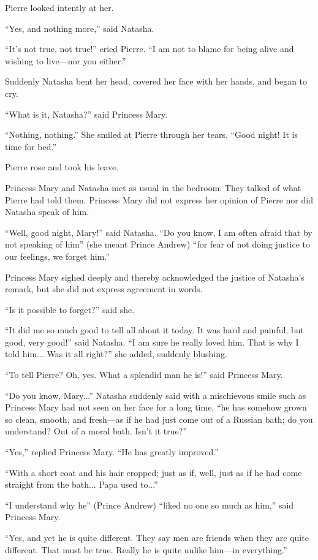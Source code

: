 Pierre looked intently at her.

``Yes, and nothing more,'' said Natasha.

``It's not true, not true!'' cried Pierre. ``I am not to blame
for being alive and wishing to live---nor you either.''

Suddenly Natasha bent her head, covered her face with her hands,
and began to cry.

``What is it, Natasha?'' said Princess Mary.

``Nothing, nothing.'' She smiled at Pierre through her
tears. ``Good night!  It is time for bed.''

Pierre rose and took his leave.

Princess Mary and Natasha met as usual in the bedroom. They
talked of what Pierre had told them. Princess Mary did not
express her opinion of Pierre nor did Natasha speak of him.

``Well, good night, Mary!'' said Natasha. ``Do you know, I am
often afraid that by not speaking of him'' (she meant Prince
Andrew) ``for fear of not doing justice to our feelings, we
forget him.''

Princess Mary sighed deeply and thereby acknowledged the justice
of Natasha's remark, but she did not express agreement in words.

``Is it possible to forget?'' said she.

``It did me so much good to tell all about it today. It was hard
and painful, but good, very good!'' said Natasha. ``I am sure he
really loved him. That is why I told him... Was it all right?''
she added, suddenly blushing.

``To tell Pierre? Oh, yes. What a splendid man he is!'' said
Princess Mary.

``Do you know, Mary...'' Natasha suddenly said with a mischievous
smile such as Princess Mary had not seen on her face for a long
time, ``he has somehow grown so clean, smooth, and fresh---as if
he had just come out of a Russian bath; do you understand? Out of
a moral bath. Isn't it true?''

``Yes,'' replied Princess Mary. ``He has greatly improved.''

``With a short coat and his hair cropped; just as if, well, just
as if he had come straight from the bath... Papa used to...''

``I understand why he'' (Prince Andrew) ``liked no one so much as
him,'' said Princess Mary.

``Yes, and yet he is quite different. They say men are friends
when they are quite different. That must be true. Really he is
quite unlike him---in everything.''


